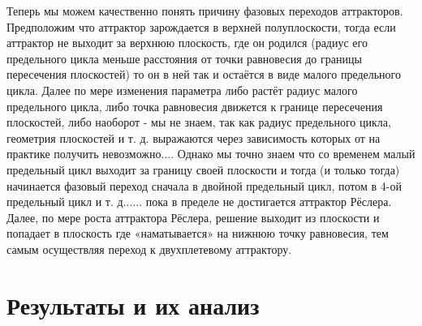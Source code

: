 \documentclass[12pt]{article}
\begin{document}
Теперь мы можем качественно понять причину фазовых переходов аттракторов. Предположим что аттрактор зарождается в верхней полуплоскости, тогда если аттрактор  не выходит за верхнюю плоскость, где он родился (радиус его предельного цикла меньше расстояния от точки равновесия до границы пересечения плоскостей) то он в ней так и остаётся в виде малого предельного цикла. Далее по мере изменения параметра либо растёт радиус малого предельного цикла, либо точка равновесия движется к границе пересечения плоскостей, либо наоборот - мы не знаем, так как радиус предельного цикла, геометрия плоскостей и т. д. выражаются через зависимость которых от на практике получить невозможно.... Однако мы точно знаем что со временем малый предельный цикл выходит за границу своей плоскости и тогда (и только тогда) начинается фазовый переход сначала в двойной предельный цикл, потом в 4-ой предельный цикл и т. д...... пока в пределе не достигается аттрактор Рёслера. Далее, по мере роста аттрактора Рёслера, решение выходит из плоскости и попадает в плоскость где «наматывается» на нижнюю точку равновесия, тем самым осуществляя переход к двухплетевому аттрактору.

\section*{Результаты и их анализ}
\end{document}
